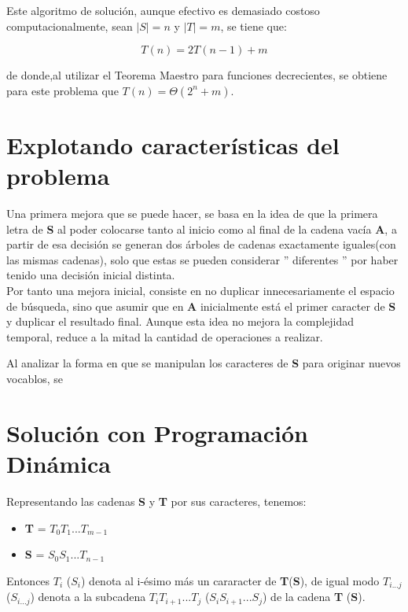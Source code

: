 \documentclass[a4paper]{article}
\begin{document}
    Este algoritmo de soluci\'on, aunque efectivo es demasiado costoso computacionalmente, sean $|S| = n$ y $|T| = m$, se tiene que:

    \begin{equation*}
        T(n) = 2 T(n-1) + m 
    \end{equation*}

    de donde,al utilizar el Teorema Maestro para funciones decrecientes, se obtiene para este problema que 
     $T(n) = \Theta(2^n + m)$.

    \section*{Explotando caracter\'isticas del problema}
    Una primera mejora que se puede hacer, se basa en la idea de que la primera letra de \textbf{S} 
    al poder colocarse tanto al inicio como al final de la cadena vac\'ia \textbf{A}, a partir de esa decisi\'on 
    se generan dos \'arboles de cadenas exactamente iguales(con las mismas cadenas), solo que estas se pueden considerar '' diferentes '' por 
    haber tenido una decisi\'on inicial distinta.\\ 

    Por tanto una mejora inicial, consiste en no duplicar innecesariamente el espacio de b\'usqueda, sino que asumir que en \textbf{A} inicialmente 
    est\'a el primer caracter de \textbf{S} y duplicar el resultado final. Aunque esta idea no mejora la complejidad temporal, reduce a la mitad la cantidad de operaciones a realizar.

    Al analizar la forma en que se manipulan los caracteres de \textbf{S} para originar nuevos vocablos, se 

    \section*{Soluci\'on con Programaci\'on Din\'amica}

    Representando las cadenas \textbf{S} y \textbf{T} por sus caracteres, tenemos:

    \begin{itemize}
        \item[] \textbf{T} = $T_0T_1 ... T_{m-1}$
        \item[] \textbf{S} = $S_0S_1 ... T_{n-1}$ 
    \end{itemize}

    Entonces $T_i$ ($S_i$) denota al i-\'esimo m\'as un cararacter de \textbf{T}(\textbf{S}), de igual modo 
    $T_{i...j}$($S_{i...j}$) denota a la subcadena $T_iT_{i+1}...T_j$ ($S_iS_{i+1}...S_{j}$) de la cadena \textbf{T} (\textbf{S}).\\
    
\end{document}
